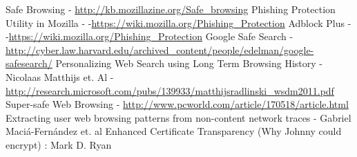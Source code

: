 \documentclass[a4paper]{article}
\begin{document}
\begin{thebibliography}{1}
Safe Browsing - 
\url{http://kb.mozillazine.org/Safe_browsing}
Phishing Protection Utility in Mozilla -  -\url{https://wiki.mozilla.org/Phishing_Protection}
Adblock Plus -  -\url{https://wiki.mozilla.org/Phishing_Protection}
Google Safe Search - \url{http://cyber.law.harvard.edu/archived_content/people/edelman/google-safesearch/}
Personalizing Web Search using Long Term Browsing History - Nicolaas Matthijs et. Al - 	\url{http://research.microsoft.com/pubs/139933/matthijsradlinski_wsdm2011.pdf}
Super-safe Web Browsing - \url{http://www.pcworld.com/article/170518/article.html}
Extracting user web browsing patterns from non-content network traces  - Gabriel Maciá-Fernández et. al
Enhanced Certificate Transparency (Why Johnny could encrypt) : Mark D. Ryan

\end{thebibliography}
\end{document}
